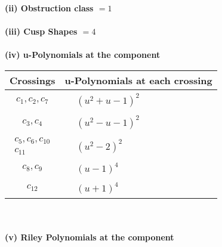 \documentclass[1p]{elsarticle_modified}
\theoremstyle{definition}
\begin{document}
\flushleft \textbf{(ii) Obstruction class $= 1$}\\~\\
\flushleft \textbf{(iii) Cusp Shapes $= 4$}\\~\\
\newpage\renewcommand{\arraystretch}{1}
\flushleft \textbf{(iv) u-Polynomials at the component}\newline \\
\begin{tabular}{m{50pt}|m{274pt}}
Crossings & \hspace{64pt}u-Polynomials at each crossing \\
\hline $$\begin{aligned}c_{1},c_{2},c_{7}\end{aligned}$$&$\begin{aligned}
&(u^2+u-1)^2
\end{aligned}$\\
\hline $$\begin{aligned}c_{3},c_{4}\end{aligned}$$&$\begin{aligned}
&(u^2- u-1)^2
\end{aligned}$\\
\hline $$\begin{aligned}c_{5},c_{6},c_{10}\\c_{11}\end{aligned}$$&$\begin{aligned}
&(u^2-2)^2
\end{aligned}$\\
\hline $$\begin{aligned}c_{8},c_{9}\end{aligned}$$&$\begin{aligned}
&(u-1)^4
\end{aligned}$\\
\hline $$\begin{aligned}c_{12}\end{aligned}$$&$\begin{aligned}
&(u+1)^4
\end{aligned}$\\
\hline
\end{tabular}\\~\\
\newpage\renewcommand{\arraystretch}{1}
\flushleft \textbf{(v) Riley Polynomials at the component}\newline \\
\end{document}
